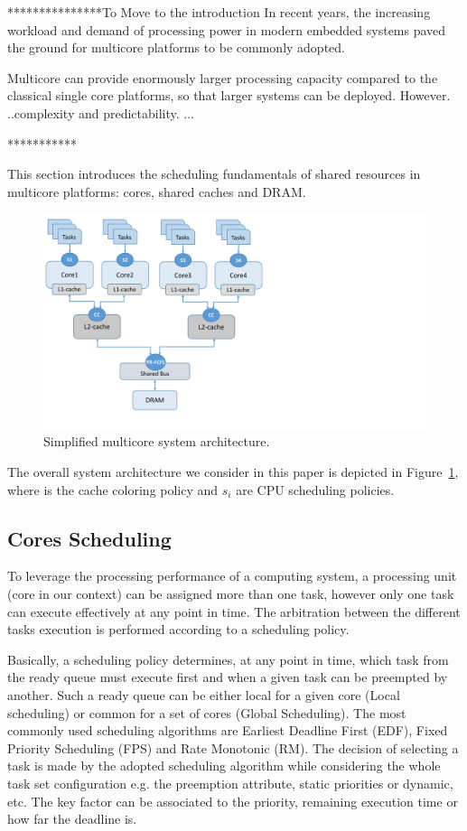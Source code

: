 \label{sec:background}

***************To Move to the introduction
In recent years, the increasing workload and demand of processing power in modern embedded systems paved the ground for multicore platforms to be commonly adopted.

Multicore can provide enormously larger processing capacity compared to the classical single core platforms,  so that larger systems can be deployed. However. ..complexity and predictability. ...

***********

This section introduces the scheduling fundamentals of shared resources in multicore platforms: cores, shared caches and DRAM. 

\begin{figure}[ht!]
\caption{Simplified multicore system architecture.}
\label{fig:architecture}
\includegraphics[scale=0.45]{architecture.pdf}
\end{figure}

The overall system architecture we consider in this paper is depicted in Figure~\ref{fig:architecture}, where is the cache coloring policy and $s_i$ are CPU scheduling policies.

\subsection{Cores Scheduling}
To leverage the processing performance of a computing system, a processing unit (core in our context) can be assigned more than one task, however only one task can execute effectively at any point in time. The arbitration between the different tasks execution is performed according to a scheduling policy. 

Basically, a scheduling policy determines, at any point in time, which task from the ready queue must execute first and when a given task can be preempted by another. Such a ready queue can be either local for a given core (Local scheduling) or common for a set of cores (Global Scheduling). The most commonly used scheduling algorithms are {Earliest Deadline First} (EDF), {Fixed Priority Scheduling} (FPS) and {Rate Monotonic} (RM).
The decision of selecting a task is made by the adopted scheduling algorithm while considering the whole task set configuration e.g.  the preemption attribute, static priorities or dynamic, etc. The key factor can be associated to the priority, remaining execution time or how far the deadline is.   
 
